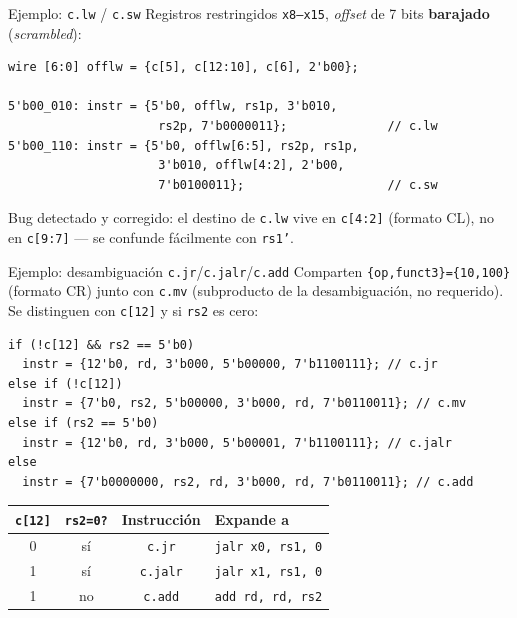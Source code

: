 \documentclass{beamer}
\begin{document}
\begin{frame}[fragile]{Ejemplo: \texttt{c.lw} / \texttt{c.sw}}
  Registros restringidos \texttt{x8--x15}, \textit{offset} de 7 bits
  \textbf{barajado} (\textit{scrambled}):
\begin{lstlisting}
wire [6:0] offlw = {c[5], c[12:10], c[6], 2'b00};

5'b00_010: instr = {5'b0, offlw, rs1p, 3'b010,
                     rs2p, 7'b0000011};              // c.lw
5'b00_110: instr = {5'b0, offlw[6:5], rs2p, rs1p,
                     3'b010, offlw[4:2], 2'b00,
                     7'b0100011};                    // c.sw
\end{lstlisting}
  \alert{Bug detectado y corregido}: el destino de \texttt{c.lw} vive en
  \texttt{c[4:2]} (formato CL), no en \texttt{c[9:7]} --- se confunde
  fácilmente con \texttt{rs1'}.
\end{frame}

\begin{frame}[fragile]{Ejemplo: desambiguación \texttt{c.jr}/\texttt{c.jalr}/\texttt{c.add}}
  Comparten \texttt{\{op,funct3\}=\{10,100\}} (formato CR) junto con
  \texttt{c.mv} (subproducto de la desambiguación, no requerido). Se
  distinguen con \texttt{c[12]} y si \texttt{rs2} es cero:
\begin{lstlisting}
if (!c[12] && rs2 == 5'b0)
  instr = {12'b0, rd, 3'b000, 5'b00000, 7'b1100111}; // c.jr
else if (!c[12])
  instr = {7'b0, rs2, 5'b00000, 3'b000, rd, 7'b0110011}; // c.mv
else if (rs2 == 5'b0)
  instr = {12'b0, rd, 3'b000, 5'b00001, 7'b1100111}; // c.jalr
else
  instr = {7'b0000000, rs2, rd, 3'b000, rd, 7'b0110011}; // c.add
\end{lstlisting}
  \begin{center}
  \small
  \begin{tabular}{@{}cccl@{}}
    \toprule
    \texttt{c[12]} & \texttt{rs2=0?} & \textbf{Instrucción} & \textbf{Expande a} \\
    \midrule
    0 & sí & \texttt{c.jr} & \texttt{jalr x0, rs1, 0} \\
    1 & sí & \texttt{c.jalr} & \texttt{jalr x1, rs1, 0} \\
    1 & no & \texttt{c.add} & \texttt{add rd, rd, rs2} \\
    \bottomrule
  \end{tabular}
  \end{center}
\end{frame}
\end{document}
